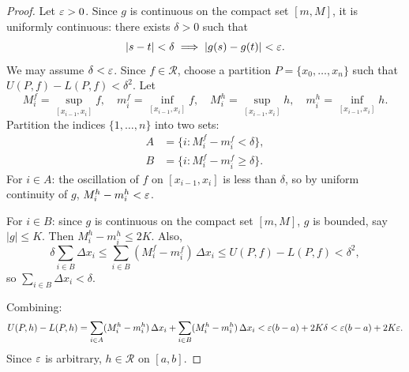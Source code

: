 \documentclass[../master/master.tex]{subfiles}
\begin{document}
\begin{proof}
Let $\varepsilon > 0$. Since $g$ is continuous on the compact set $[m, M]$, it is uniformly continuous: there exists $\delta > 0$ such that
\[
|s - t| < \delta \implies |g(s) - g(t)| < \varepsilon.
\]
We may assume $\delta < \varepsilon$. Since $f \in \mathscr{R}$, choose a partition $P = \{x_0, \dots, x_n\}$ such that $U(P, f) - L(P, f) < \delta^2$. Let
\[
M_i^f = \sup_{[x_{i-1},x_i]} f, \quad m_i^f = \inf_{[x_{i-1},x_i]} f, \quad M_i^h = \sup_{[x_{i-1},x_i]} h, \quad m_i^h = \inf_{[x_{i-1},x_i]} h.
\]
Partition the indices $\{1, \dots, n\}$ into two sets:
\begin{align*}
A &= \{i : M_i^f - m_i^f < \delta\}, \\
B &= \{i : M_i^f - m_i^f \geq \delta\}.
\end{align*}
For $i \in A$: the oscillation of $f$ on $[x_{i-1}, x_i]$ is less than $\delta$, so by uniform continuity of $g$, $M_i^h - m_i^h < \varepsilon$.

For $i \in B$: since $g$ is continuous on the compact set $[m,M]$, $g$ is bounded, say $|g| \leq K$. Then $M_i^h - m_i^h \leq 2K$. Also,
\[
\delta \sum_{i \in B} \Delta x_i \leq \sum_{i \in B} (M_i^f - m_i^f)\,\Delta x_i \leq U(P,f) - L(P,f) < \delta^2,
\]
so $\sum_{i \in B} \Delta x_i < \delta$.

Combining:
\[
U(P, h) - L(P, h) = \sum_{i \in A} (M_i^h - m_i^h)\,\Delta x_i + \sum_{i \in B} (M_i^h - m_i^h)\,\Delta x_i < \varepsilon(b - a) + 2K\delta < \varepsilon(b - a) + 2K\varepsilon.
\]
Since $\varepsilon$ is arbitrary, $h \in \mathscr{R}$ on $[a,b]$.
\end{proof}
\end{document}
